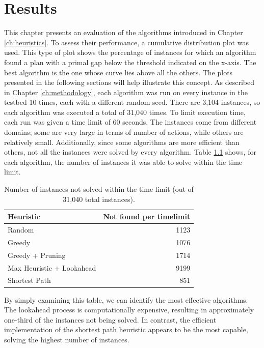 \chapter{Results}
\label{ch:results}
This chapter presents an evaluation of the algorithms introduced in Chapter \ref{ch:heuristics}.
To assess their performance, a cumulative distribution plot was used.
This type of plot shows the percentage of instances for which an algorithm found a plan with a
primal gap below the threshold indicated on the x-axis.
The best algorithm is the one whose curve lies above all the others.
The plots presented in the following sections will help illustrate this concept.
As described in Chapter \ref{ch:methodology}, each algorithm was run on every instance in the
testbed 10 times, each with a different random seed.
There are 3,104 instances, so each algorithm was executed a total of 31,040 times.
To limit execution time, each run was given a time limit of 60 seconds. The instances
come from different domains; some are very large in terms of number of actions, while others are
relatively small.
Additionally, since some algorithms are more efficient than others, not all the instances
were solved by every algorithm. Table \ref{tab:timelimit} shows, for each algorithm,
the number of instances it was able to solve within the time limit.

\begin{table}[ht]
	\centering
	\begin{tabular}{|l|r|}
		\hline
		\textbf{Heuristic}        & \textbf{Not found per timelimit} \\
		\hline
		Random                    & 1123                             \\
		Greedy                    & 1076                             \\
		Greedy + Pruning          & 1714                             \\
		Max Heuristic + Lookahead & 9199                             \\
		Shortest Path             & 851                              \\
		\hline
	\end{tabular}
	\caption{Number of instances not solved within the time limit (out of 31,040 total instances).}
	\label{tab:timelimit}
\end{table}

By simply examining this table, we can identify the most effective algorithms.
The lookahead process is computationally expensive, resulting in approximately one-third of the instances not being solved.
In contrast, the efficient implementation of the shortest path heuristic appears to be the most capable,
solving the highest number of instances.

